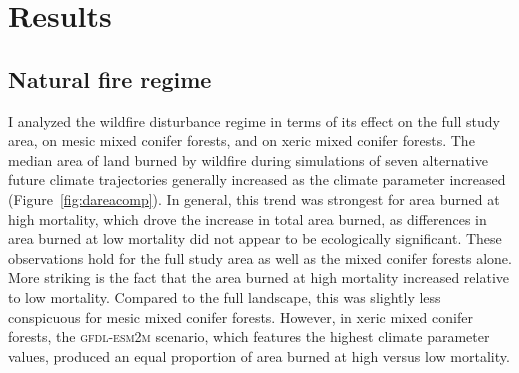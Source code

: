 \section{Results}

\subsection*{Natural fire regime}

I analyzed the wildfire disturbance regime in terms of its effect on the full study area, on mesic mixed conifer forests, and on xeric mixed conifer forests.%
%
The median area of land burned by wildfire during simulations of seven alternative future climate trajectories generally increased as the climate parameter increased (Figure~\ref{fig:dareacomp}). In general, this trend was strongest for area burned at high mortality, which drove the increase in total area burned, as differences in area burned at low mortality did not appear to be ecologically significant. These observations hold for the full study area as well as the mixed conifer forests alone. More striking is the fact that the area burned at high mortality increased relative to low mortality. Compared to the full landscape, this was slightly less conspicuous for mesic mixed conifer forests. However, in xeric mixed conifer forests, the \textsc{gfdl-esm2m} scenario, which features the highest climate parameter values, produced an equal proportion of area burned at high versus low mortality.


